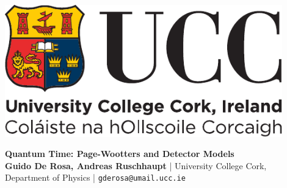 \documentclass[a0,landscape]{a0poster}
\begin{document}
\begin{minipage}[c]{0.40\linewidth}
  \vspace{1.5cm}\hspace{0cm}\includegraphics[width=12cm]{ucc_logo.pdf}\\[0.0cm]
\end{minipage}%
\begin{minipage}[c]{0.60\linewidth}\begin{flushright}%
\veryHuge\color{NavyBlue}\textbf{Quantum Time: Page-Wootters and Detector Models}%
\color{Black}%
\\[0.5cm]
  \Large \textbf{Guido De Rosa, Andreas Ruschhaupt} |
  \Large University College Cork, Department of Physics | %
  \texttt{gderosa@umail.ucc.ie}
\end{flushright}\end{minipage}%
%


\end{document}
